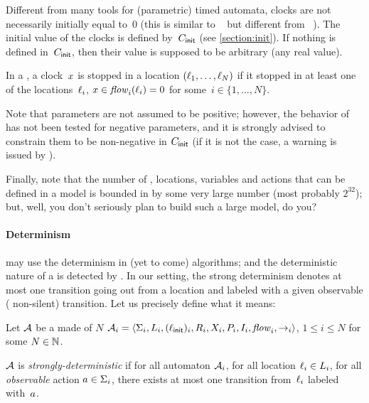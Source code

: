 Different from many tools for (parametric) timed automata, clocks are not necessarily initially equal to~0 (this is similar to \hytech{}~\cite{HHW95} but different from \uppaal{}~\cite{LPY97}).
The initial value of the clocks is defined by~$C_{\textsf{init}}$ (see \cref{section:init}).
If nothing is defined in~$C_{\textsf{init}}$, then their value is supposed to be arbitrary (any real value).


In a \NIPTA{}, a clock~$x$ is stopped in a location $(\ell_1, \dots, \ell_N)$ if it stopped in at least one of the locations~$\ell_i$, \ie{} $x \in \mathit{flow}_i(\ell_i) = 0$ for some~$i \in \{ 1 , \dots , N \}$.

Note that parameters are not assumed to be positive; however, the behavior of \imitator{} has not been tested for negative parameters, and it is strongly advised to constrain them to be non-negative in $C_{\textsf{init}}$ (if it is not the case, a warning is issued by \imitator{}).


Finally, note that the number of \IPTA{}, locations, variables and actions that can be defined in a model is bounded in \imitator{} by some very large number (most probably $2^{32}$); but, well, you don't seriously plan to build such a large model, do you?


\paragraph{Determinism}
\imitator{} may use the determinism in (yet to come) algorithms; and the deterministic nature of a \NIPTA{} is detected by \imitator{}.
In our setting, the strong determinism denotes at most one transition going out from a location and labeled with a given observable (\ie{} non-silent) transition.
Let us precisely define what it means:

\begin{definition}
	Let $\mathcal{A}$ be a \NIPTA{} made of $N$ \IPTA{} $\mathcal{A}_i = \langle\Sigma_i, L_i, (\ell_{\textsf{init}})_i, R_i, X_i, P_i, I_i, \mathit{flow}_i, {\rightarrow}_i\rangle$, $1 \leq i \leq N$ for some $N \in \mathbb N$.

	$\mathcal{A}$ is \emph{strongly-deterministic} if
	for all automaton $\mathcal{A}_i$,
	for all location $\ell_i \in L_i$,
	for all \emph{observable} action $a \in \Sigma_i$,
	there exists at most one transition from~$\ell_i$ labeled with~$a$.
\end{definition}

